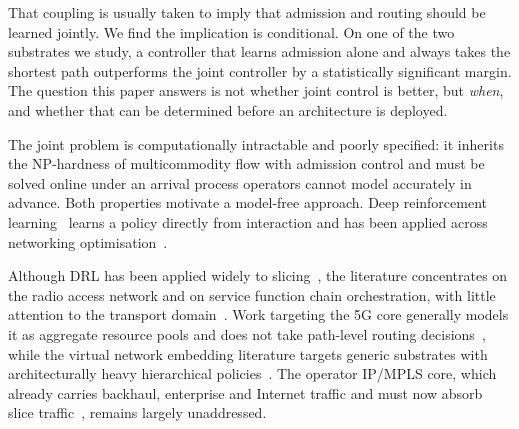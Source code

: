 \documentclass[10pt,journal,comsoc]{IEEEtran}
\begin{document}
That coupling is usually taken to imply that admission and routing should
be learned jointly. We find the implication is conditional. On one of the
two substrates we study, a controller that learns admission alone and
always takes the shortest path outperforms the joint controller by a
statistically significant margin. The question this paper answers is not
whether joint control is better, but \emph{when}, and whether that can be
determined before an architecture is deployed.

The joint problem is computationally intractable and poorly specified: it
inherits the NP-hardness of multicommodity flow with admission control and
must be solved online under an arrival process operators cannot model
accurately in advance. Both properties motivate a model-free
approach. Deep reinforcement learning~\cite{sutton2018reinforcement} learns
a policy directly from interaction and has been applied across networking
optimisation~\cite{luong2019applications}.

Although DRL has been applied widely to slicing~\cite{ssengonzi2022survey},
the literature concentrates on the radio access network and on service
function chain orchestration, with little attention to the transport
domain~\cite{saha2023deep}. Work targeting the 5G core generally models it
as aggregate resource pools and does not take path-level routing
decisions~\cite{villota2022admission,wang2024fsac,sulaiman2025datadriven},
while the virtual network embedding literature targets generic substrates
with architecturally heavy hierarchical
policies~\cite{xiong2024hrlacra,wang2024flagvne}. The operator IP/MPLS
core, which already carries backhaul, enterprise and Internet traffic and
must now absorb slice traffic~\cite{10258168}, remains largely unaddressed.
\end{document}
